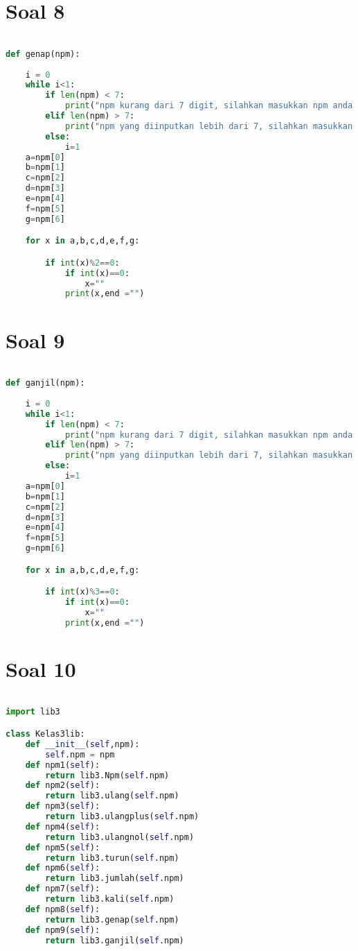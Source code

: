 \section*{Soal 8}
\begin{lstlisting}[language=Python]

def genap(npm):
    
    i = 0
    while i<1:
        if len(npm) < 7:
            print("npm kurang dari 7 digit, silahkan masukkan npm anda kembali")
        elif len(npm) > 7:
            print("npm yang diinputkan lebih dari 7, silahkan masukkan npm anda kembali")
        else:
            i=1
    a=npm[0]
    b=npm[1]
    c=npm[2]
    d=npm[3]
    e=npm[4]
    f=npm[5]
    g=npm[6]

    for x in a,b,c,d,e,f,g:

        if int(x)%2==0:
            if int(x)==0:
                x=""
            print(x,end ="")


\end{lstlisting}
\section*{Soal 9}
\begin{lstlisting}[language=Python]

def ganjil(npm):
    
    i = 0
    while i<1:
        if len(npm) < 7:
            print("npm kurang dari 7 digit, silahkan masukkan npm anda kembali")
        elif len(npm) > 7:
            print("npm yang diinputkan lebih dari 7, silahkan masukkan npm anda kembali")
        else:
            i=1
    a=npm[0]
    b=npm[1]
    c=npm[2]
    d=npm[3]
    e=npm[4]
    f=npm[5]
    g=npm[6]

    for x in a,b,c,d,e,f,g:

        if int(x)%3==0:
            if int(x)==0:
                x=""
            print(x,end ="")


\end{lstlisting}
\section*{Soal 10}
\begin{lstlisting}[language=Python]

import lib3

class Kelas3lib:
    def __init__(self,npm):
        self.npm = npm
    def npm1(self):
        return lib3.Npm(self.npm)
    def npm2(self):
        return lib3.ulang(self.npm)
    def npm3(self):
        return lib3.ulangplus(self.npm)
    def npm4(self):
        return lib3.ulangnol(self.npm)
    def npm5(self):
        return lib3.turun(self.npm)
    def npm6(self):
        return lib3.jumlah(self.npm)
    def npm7(self):
        return lib3.kali(self.npm)
    def npm8(self):
        return lib3.genap(self.npm)
    def npm9(self):
        return lib3.ganjil(self.npm)
    











\end{lstlisting}
